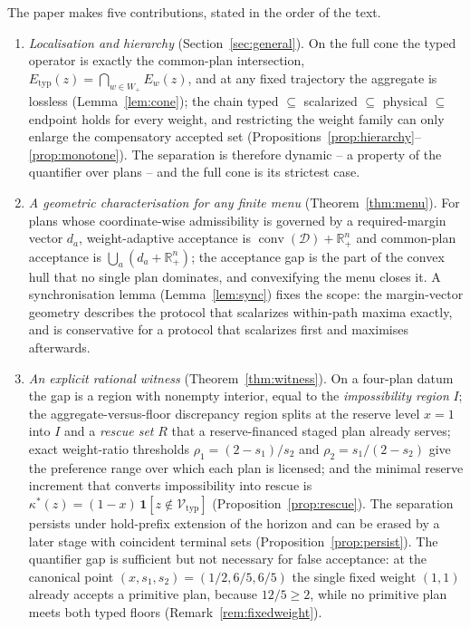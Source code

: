 \documentclass[preprint,11pt,authoryear]{elsarticle}
\theoremstyle{definition}
\theoremstyle{remark}
\newcommand{\Etyp}{E_{\mathrm{typ}}}
\newcommand{\Vtyp}{\mathcal{V}_{\mathrm{typ}}}
\newcommand{\Wp}{W_+}
\newcommand{\conv}{\operatorname{conv}}
\newcommand{\Rp}{\mathbb{R}^n_+}
\begin{document}
The paper makes five contributions, stated in the order of the text.
\begin{enumerate}[leftmargin=2em,label=(\roman*)]
\item \emph{Localisation and hierarchy} (Section~\ref{sec:general}). On the full cone the typed operator is exactly the common-plan intersection, $\Etyp(z)=\bigcap_{w\in\Wp}E_w(z)$, and at any fixed trajectory the aggregate is lossless (Lemma~\ref{lem:cone}); the chain typed $\subseteq$ scalarized $\subseteq$ physical $\subseteq$ endpoint holds for every weight, and restricting the weight family can only enlarge the compensatory accepted set (Propositions~\ref{prop:hierarchy}--\ref{prop:monotone}). The separation is therefore dynamic -- a property of the quantifier over plans -- and the full cone is its strictest case.
\item \emph{A geometric characterisation for any finite menu} (Theorem~\ref{thm:menu}). For plans whose coordinate-wise admissibility is governed by a required-margin vector $d_a$, weight-adaptive acceptance is $\conv(\mathcal D)+\Rp$ and common-plan acceptance is $\bigcup_a(d_a+\Rp)$; the acceptance gap is the part of the convex hull that no single plan dominates, and convexifying the menu closes it. A synchronisation lemma (Lemma~\ref{lem:sync}) fixes the scope: the margin-vector geometry describes the protocol that scalarizes within-path maxima exactly, and is conservative for a protocol that scalarizes first and maximises afterwards.
\item \emph{An explicit rational witness} (Theorem~\ref{thm:witness}). On a four-plan datum the gap is a region with nonempty interior, equal to the \emph{impossibility region} $I$; the aggregate-versus-floor discrepancy region splits at the reserve level $x=1$ into $I$ and a \emph{rescue set} $R$ that a reserve-financed staged plan already serves; exact weight-ratio thresholds $\rho_1=(2-s_1)/s_2$ and $\rho_2=s_1/(2-s_2)$ give the preference range over which each plan is licensed; and the minimal reserve increment that converts impossibility into rescue is $\kappa^*(z)=(1-x)\,\mathbf 1[z\notin\Vtyp]$ (Proposition~\ref{prop:rescue}). The separation persists under hold-prefix extension of the horizon and can be erased by a later stage with coincident terminal sets (Proposition~\ref{prop:persist}). The quantifier gap is sufficient but not necessary for false acceptance: at the canonical point $(x,s_1,s_2)=(1/2,6/5,6/5)$ the single fixed weight $(1,1)$ already accepts a primitive plan, because $12/5\ge2$, while no primitive plan meets both typed floors (Remark~\ref{rem:fixedweight}).

\end{enumerate}
\end{document}
